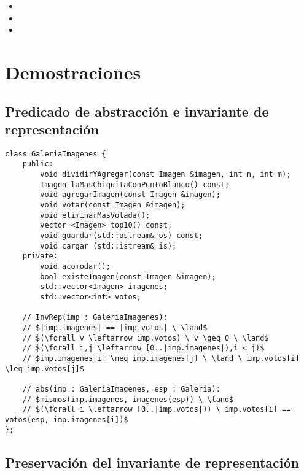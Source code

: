 \documentclass[10pt,a4paper,spanish]{article}
\begin{document}
\begin{itemize}
	\item {}

	\item {}

	\item \auxil{listaVotosOrdenados(g: Galeria, imgs: [Imagen]) : [\ent]}{ \newline
	  [votos(g,im) \ | \ i \leftarrow [0..|imgs|),im \leftarrow imgs, cuentaMasVotos(g,imgs,im)==i]
	}

\end{itemize}

\section{Demostraciones}

\subsection{Predicado de abstracción e invariante de representación}

\begin{lstlisting}
class GaleriaImagenes {
	public:
		void dividirYAgregar(const Imagen &imagen, int n, int m);
		Imagen laMasChiquitaConPuntoBlanco() const;
		void agregarImagen(const Imagen &imagen);
		void votar(const Imagen &imagen);
		void eliminarMasVotada();
		vector <Imagen> top10() const;
		void guardar(std::ostream& os) const;
		void cargar (std::istream& is);
	private:
		void acomodar();
		bool existeImagen(const Imagen &imagen);
		std::vector<Imagen> imagenes;
		std::vector<int> votos;

	// InvRep(imp : GaleriaImagenes):
	// $|imp.imagenes| == |imp.votos| \ \land$
	// $(\forall v \leftarrow imp.votos) \ v \geq 0 \ \land$
	// $(\forall i,j \leftarrow [0..|imp.imagenes|),i < j)$
	// $imp.imagenes[i] \neq imp.imagenes[j] \ \land \ imp.votos[i] \leq imp.votos[j]$

	// abs(imp : GaleriaImagenes, esp : Galeria):
	// $mismos(imp.imagenes, imagenes(esp)) \ \land$
	// $(\forall i \leftarrow [0..|imp.votos|)) \ imp.votos[i] == votos(esp, imp.imagenes[i])$
};
\end{lstlisting}

\subsection{Preservación del invariante de representación}
\end{document}
